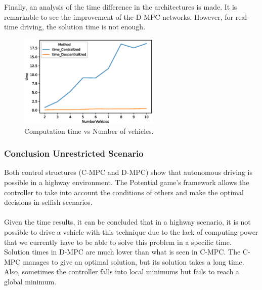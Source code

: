 Finally, an analysis of the time difference in the architectures is made. It is remarkable to see the improvement of the D-MPC networks. However, for real-time driving, the solution time is not enough.

\begin{figure}[H]
\centering
    \includegraphics[width=0.6\textwidth]{Kap6/no_restricted/no_restricted_n_vehicles.eps}
    \caption{Computation time vs Number of vehicles.}
\end{figure}





\subsubsection{Conclusion Unrestricted Scenario}

Both control structures (C-MPC and D-MPC) show that autonomous driving is possible in a highway environment. The Potential game's framework allows the controller to take into account the conditions of others and make the optimal decisions in selfish scenarios.
\\
\\
Given the time results, it can be concluded that in a highway scenario, it is not possible to drive a vehicle with this technique due to the lack of computing power that we currently have to be able to solve this problem in a specific time. Solution times in D-MPC are much lower than what is seen in C-MPC. The C-MPC manages to give an optimal solution, but its solution takes a long time. Also, sometimes the controller falls into local minimums but fails to reach a global minimum.

